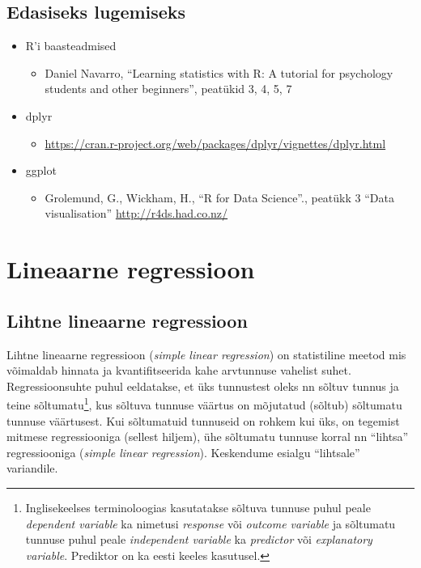 \documentclass[
]{book}
\providecommand{\tightlist}{%
  \setlength{\itemsep}{0pt}\setlength{\parskip}{0pt}}
\begin{document}
\hypertarget{edasiseks-lugemiseks}{%
\section{Edasiseks lugemiseks}\label{edasiseks-lugemiseks}}

\begin{itemize}
\tightlist
\item
  R'i baasteadmised

  \begin{itemize}
  \tightlist
  \item
    Daniel Navarro, ``Learning statistics with R: A tutorial for psychology students and other beginners'', peatükid 3, 4, 5, 7\\
  \end{itemize}
\item
  dplyr

  \begin{itemize}
  \tightlist
  \item
    \url{https://cran.r-project.org/web/packages/dplyr/vignettes/dplyr.html}
  \end{itemize}
\item
  ggplot

  \begin{itemize}
  \tightlist
  \item
    Grolemund, G., Wickham, H., ``R for Data Science''., peatükk 3 ``Data visualisation'' \url{http://r4ds.had.co.nz/}
  \end{itemize}
\end{itemize}

\hypertarget{lineaarne-regressioon}{%
\chapter{Lineaarne regressioon}\label{lineaarne-regressioon}}

\hypertarget{lihtne-lineaarne-regressioon}{%
\section{Lihtne lineaarne regressioon}\label{lihtne-lineaarne-regressioon}}

Lihtne lineaarne regressioon (\emph{simple linear regression}) on statistiline meetod mis võimaldab hinnata ja kvantifitseerida kahe arvtunnuse vahelist suhet. Regressioonsuhte puhul eeldatakse, et üks tunnustest oleks nn sõltuv tunnus ja teine sõltumatu\footnote{Inglisekeelses terminoloogias kasutatakse sõltuva tunnuse puhul peale \emph{dependent variable} ka nimetusi \emph{response} või \emph{outcome variable} ja sõltumatu tunnuse puhul peale \emph{independent variable} ka \emph{predictor} või \emph{explanatory variable}. Prediktor on ka eesti keeles kasutusel.}, kus sõltuva tunnuse väärtus on mõjutatud (sõltub) sõltumatu tunnuse väärtusest. Kui sõltumatuid tunnuseid on rohkem kui üks, on tegemist mitmese regressiooniga (sellest hiljem), ühe sõltumatu tunnuse korral nn ``lihtsa'' regressiooniga (\emph{simple linear regression}). Keskendume esialgu ``lihtsale'' variandile.
\end{document}
